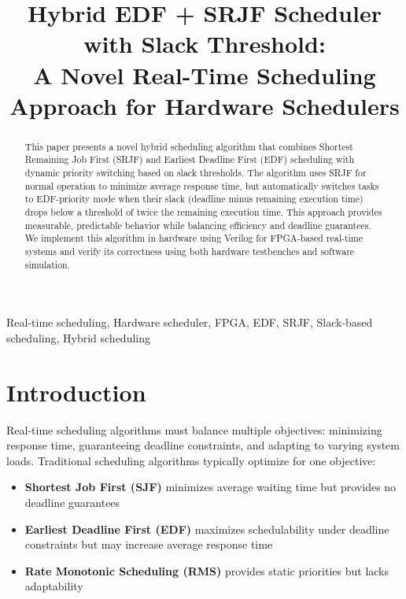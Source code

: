 \documentclass[conference]{IEEEtran}
\begin{document}
\title{Hybrid EDF + SRJF Scheduler with Slack Threshold:\\
A Novel Real-Time Scheduling Approach for Hardware Schedulers}

\author{
}

\maketitle

\begin{abstract}
This paper presents a novel hybrid scheduling algorithm that combines Shortest Remaining Job First (SRJF) and Earliest Deadline First (EDF) scheduling with dynamic priority switching based on slack thresholds. The algorithm uses SRJF for normal operation to minimize average response time, but automatically switches tasks to EDF-priority mode when their slack (deadline minus remaining execution time) drops below a threshold of twice the remaining execution time. This approach provides measurable, predictable behavior while balancing efficiency and deadline guarantees. We implement this algorithm in hardware using Verilog for FPGA-based real-time systems and verify its correctness using both hardware testbenches and software simulation.
\end{abstract}

\begin{IEEEkeywords}
Real-time scheduling, Hardware scheduler, FPGA, EDF, SRJF, Slack-based scheduling, Hybrid scheduling
\end{IEEEkeywords}

\section{Introduction}

Real-time scheduling algorithms must balance multiple objectives: minimizing response time, guaranteeing deadline constraints, and adapting to varying system loads. Traditional scheduling algorithms typically optimize for one objective:

\begin{itemize}
    \item \textbf{Shortest Job First (SJF)} minimizes average waiting time but provides no deadline guarantees
    \item \textbf{Earliest Deadline First (EDF)} maximizes schedulability under deadline constraints but may increase average response time
    \item \textbf{Rate Monotonic Scheduling (RMS)} provides static priorities but lacks adaptability
\end{itemize}
\end{document}
